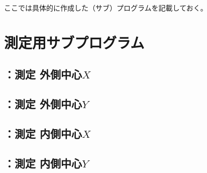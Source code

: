 
ここでは具体的に作成した（サブ）プログラムを記載しておく。



\section{測定用サブプログラム}


\subsection{\MXOThickness：測定 外側中心\texorpdfstring{$X$}{X}}



\clearpage
\subsection{\MYOThickness：測定 外側中心\texorpdfstring{$Y$}{Y}}



\clearpage
\subsection{\MXIWidth：測定 内側中心\texorpdfstring{$X$}{X}}



\clearpage
\subsection{\MYIWidth：測定 内側中心\texorpdfstring{$Y$}{Y}}



